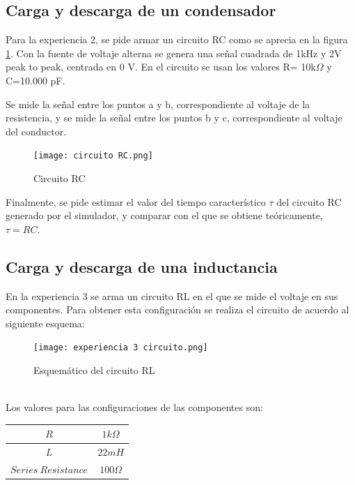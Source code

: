 \documentclass[letterpaper,11pt]{article} %
\begin{document}

\subsection{Carga y descarga de un condensador}
Para la experiencia 2, se pide armar un circuito RC 
como se aprecia en la figura \ref{circuito rc}. Con la fuente 
de voltaje alterna se genera una señal cuadrada de 
1kHz y 2V peak to peak, centrada en 0 V. En el circuito se usan los valores
R= 10k$\Omega$ y C=10.000 pF.

Se mide la señal entre los puntos a y b, correspondiente al 
voltaje de la resistencia, y se mide la señal
entre los puntos b y c, correspondiente al voltaje
del conductor. 

\begin{figure}
    \centering
    \texttt{[image: circuito RC.png]}
    \caption{Circuito RC}
    \label{circuito rc}
\end{figure}
Finalmente, se pide estimar el valor del tiempo característico $\tau$ del circuito RC generado por el simulador, y comparar con el que se obtiene teóricamente, $\tau= RC$.

\subsection{Carga y descarga de una inductancia}
En la experiencia 3 se arma un circuito RL en el que se mide el voltaje en sus componentes. Para obtener esta configuración se realiza el circuito de acuerdo al siguiente esquema:\\
\begin{figure}
    \centering
    \texttt{[image: experiencia 3 circuito.png]}
    \caption{Esquemático del circuito RL}
    \label{fig:exp3_circuito}
\end{figure}
\\

Los valores para las configuraciones de las componentes son:\\
\begin{center}
\begin{tabular}{|c|c|}
    \hline
    $R$ & $1k \Omega$ \\ \hline
    $L$ & $22mH$ \\ \hline
    $Series~Resistance$ & $100\Omega$\\ \hline
\end{tabular}
\end{center}
\end{document}
